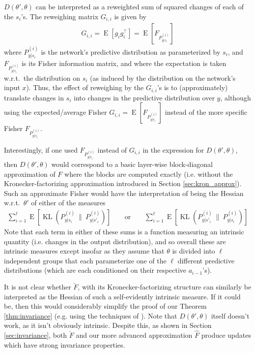 \documentclass[12pt]{article}
\newcommand{\expected}{\operatorname{E}}
\DeclareMathOperator{\KL}{KL}
\begin{document}
$D(\theta',\theta)$ can be interpreted as a reweighted sum of squared changes of each of the $s_i$'s.  The reweighing matrix $G_{i,i}$ is given by
\begin{align*}
G_{i,i} = \expected \left[ g_i g_i^\top \right] = \expected\left[F_{P^{(i)}_{y|s_i}}\right]
\end{align*}
where $P^{(i)}_{y|s_i}$ is the network's predictive distribution as parameterized by $s_i$, and $F_{P^{(i)}_{y|s_i}}$ is its Fisher information matrix, and where the expectation is taken w.r.t.~the distribution on $s_i$ (as induced by the distribution on the network's input $x$).  Thus, the effect of reweighing by the $G_{i,i}$'s is to (approximately) translate changes in $s_i$ into changes in the predictive distribution over $y$, although using the expected/average Fisher $G_{i,i} = \expected[F_{P^{(i)}_{y|s_i}}]$ instead of the more specific Fisher $F_{P^{(i)}_{y|s_i}}$.  

Interestingly, if one used $F_{P^{(i)}_{y|s_i}}$ instead of $G_{i,i}$ in the expression for $D(\theta',\theta)$, then $D(\theta',\theta)$ would correspond to a basic layer-wise block-diagonal approximation of $F$ where the blocks are computed exactly (i.e. without the Kronecker-factorizing approximation introduced in Section \ref{sec:kron_approx}).  Such an approximate Fisher would have the interpretation of being the Hessian w.r.t.~$\theta'$ of either of the measures
\begin{align*}
\sum_{i=1}^\ell \expected \left[ \KL \left ( P^{(i)}_{y|s_i} \: \| \: P^{(i)}_{y| s'_i} \right )\right] \quad\quad \mbox{or} \quad\quad \sum_{i=1}^\ell \expected \left[ \KL \left ( P^{(i)}_{y| s'_i}  \: \| \: P^{(i)}_{y|s_i} \right ) \right]
\end{align*}
Note that each term in either of these sums is a function measuring an intrinsic quantity (i.e. changes in the output distribution), and so overall these are intrinsic measures except insofar as they assume that $\theta$ is divided into $\ell$ independent groups that each parameterize one of the $\ell$ different predictive distributions (which are each conditioned on their respective $a_{i-1}$'s).

It is not clear whether $\breve{F}$, with its Kronecker-factorizing structure can similarly be interpreted as the Hessian of such a self-evidently intrinsic measure.  If it could be, then this would considerably simplify the proof of our Theorem \ref{thm:invariance} (e.g. using the techniques of \citet{IGO}).  Note that $D(\theta',\theta)$ itself doesn't work, as it isn't obviously intrinsic.  Despite this, as shown in Section \ref{sec:invariance}, both $\breve{F}$ and our more advanced approximation $\hat{F}$ produce updates which have strong invariance properties.
\end{document}
